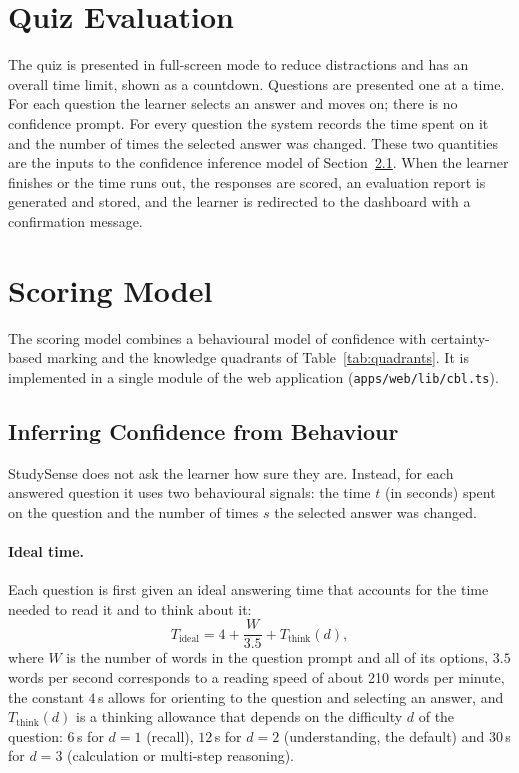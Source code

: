 \documentclass[12pt,a4paper,oneside]{report}
\begin{document}
\section{Quiz Evaluation}

The quiz is presented in full-screen mode to reduce distractions and has
an overall time limit, shown as a countdown. Questions are presented one
at a time. For each question the learner selects an answer and moves on;
there is no confidence prompt. For every question the system records the
time spent on it and the number of times the selected answer was changed.
These two quantities are the inputs to the confidence inference model of
Section~\ref{sec:inference}. When the learner finishes or the time
runs out, the responses are scored, an evaluation report is generated and
stored, and the learner is redirected to the dashboard with a confirmation
message.

\section{Scoring Model}\label{sec:scoring}

The scoring model combines a behavioural model of confidence with
certainty-based marking \cite{gardnermedwin2003} and the knowledge
quadrants of Table~\ref{tab:quadrants}. It is implemented in a single
module of the web application (\texttt{apps/web/lib/cbl.ts}).

\subsection{Inferring Confidence from Behaviour}\label{sec:inference}

StudySense does not ask the learner how sure they are. Instead, for each
answered question it uses two behavioural signals: the time $t$ (in
seconds) spent on the question and the number of times $s$ the selected
answer was changed.

\paragraph{Ideal time.} Each question is first given an ideal answering
time that accounts for the time needed to read it and to think about it:
\begin{equation}
  T_{\mathrm{ideal}} = 4 + \frac{W}{3.5} + T_{\mathrm{think}}(d),
  \label{eq:ideal}
\end{equation}
where $W$ is the number of words in the question prompt and all of its
options, $3.5$ words per second corresponds to a reading speed of about
210 words per minute, the constant $4$\,s allows for orienting to the
question and selecting an answer, and $T_{\mathrm{think}}(d)$ is a thinking
allowance that depends on the difficulty $d$ of the question:
$6$\,s for $d=1$ (recall), $12$\,s for $d=2$ (understanding, the default)
and $30$\,s for $d=3$ (calculation or multi-step reasoning).
\end{document}
